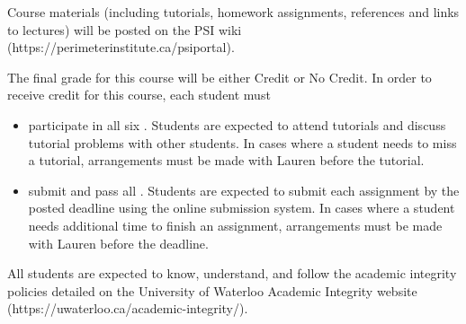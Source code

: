 \documentclass[letterpaper]{scrartcl}
\begin{document}
\vspace*{0.6cm}
\noindent{} 
\normalfont Course materials (including tutorials, homework assignments, references and links to lectures) 
will be posted on the PSI wiki 
(https://perimeterinstitute.ca/psi{\textunderscore}portal).

\vspace*{0.8cm}
\noindent{} 
\normalfont The final grade for this course will be either Credit or No Credit. 
In order to receive credit for this course, each student must
\begin{itemize}
\setlength{\itemsep}{0.5ex}
\item participate in all six . \normalfont Students are expected to attend tutorials and discuss tutorial problems with other students. 
In cases where a student needs to miss a tutorial, arrangements must be made with Lauren before the tutorial.

\item submit and pass all . \normalfont Students are expected to submit each assignment by the posted deadline using the online submission system. 
In cases where a student needs additional time to finish an assignment, arrangements must be made with Lauren before the deadline.
\end{itemize}

\vspace*{0.6cm}
\noindent{} \normalfont All students are expected to know, understand, and follow the academic integrity policies detailed on the University of Waterloo Academic Integrity website \\
(https://uwaterloo.ca/academic-integrity/).
\end{document}

